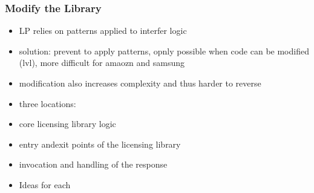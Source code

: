 \subsubsection{Modify the Library} \label{subsection:counter-modifications-library}
\begin{itemize}
  \item LP relies on patterns applied to interfer logic
  \item solution: prevent to apply patterns, opnly possible when code can be modified (lvl), more difficult for amaozn and samsung
  \item modification also increases complexity and thus harder to reverse
  \item three locations:
  \item core licensing library logic
  \item entry andexit points of the licensing library
  \item invocation and handling of the response
  \item Ideas for each
\end{itemize}
